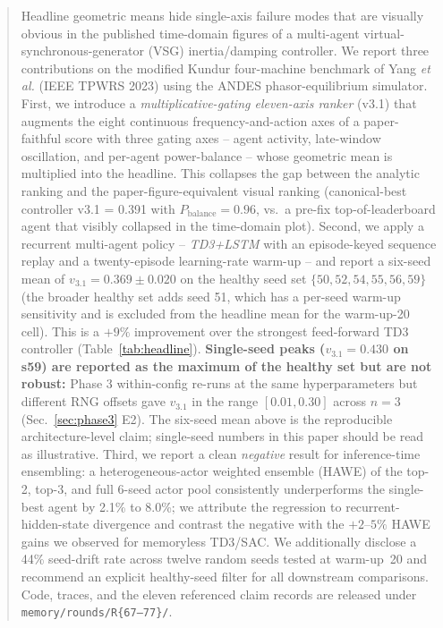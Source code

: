 \documentclass[journal,onecolumn,11pt]{IEEEtran}
\begin{document}
\begin{abstract}
Headline geometric means hide single-axis failure modes that are
visually obvious in the published time-domain figures of a
multi-agent virtual-synchronous-generator (VSG) inertia/damping
controller. We report three contributions on the modified Kundur
four-machine benchmark of Yang \emph{et al.} (IEEE TPWRS 2023) using
the ANDES phasor-equilibrium simulator. First, we introduce a
\emph{multiplicative-gating eleven-axis ranker} (v3.1) that augments
the eight continuous frequency-and-action axes of a paper-faithful
score with three gating axes -- agent activity, late-window
oscillation, and per-agent power-balance -- whose geometric mean is
multiplied into the headline. This collapses the gap between the
analytic ranking and the paper-figure-equivalent visual ranking
(canonical-best controller v3.1 = 0.391 with $P_{\text{balance}} =
0.96$, vs.\ a pre-fix top-of-leaderboard agent that visibly collapsed
in the time-domain plot). Second, we apply a recurrent multi-agent
policy -- \emph{TD3+LSTM} with an episode-keyed sequence replay
and a twenty-episode learning-rate warm-up -- and report a
six-seed mean of $v_{3.1} = 0.369 \pm 0.020$ on the healthy seed
set $\{50, 52, 54, 55, 56, 59\}$ (the broader healthy set adds
seed 51, which has a per-seed warm-up sensitivity and is excluded
from the headline mean for the warm-up-20 cell). This is a $+9\%$
improvement over the strongest feed-forward TD3 controller
(Table~\ref{tab:headline}). \textbf{Single-seed peaks
($v_{3.1} = 0.430$ on s59) are reported as the maximum of the
healthy set but are not robust:} Phase 3 within-config re-runs at
the same hyperparameters but different RNG offsets gave
$v_{3.1}$ in the range $[0.01, 0.30]$ across $n=3$
(Sec.~\ref{sec:phase3} E2). The six-seed mean above is the
reproducible architecture-level claim; single-seed numbers in
this paper should be read as illustrative. Third, we report a clean
\emph{negative} result for inference-time ensembling: a
heterogeneous-actor weighted ensemble (HAWE) of the top-2, top-3,
and full 6-seed actor pool consistently underperforms the single-best
agent by 2.1\% to 8.0\%; we attribute the regression to
recurrent-hidden-state divergence and contrast the negative with the
$+2$--$5\%$ HAWE gains we observed for memoryless TD3/SAC. We
additionally disclose a 44\% seed-drift rate across twelve random
seeds tested at warm-up~20 and recommend an explicit healthy-seed
filter for all downstream comparisons. Code, traces, and the eleven
referenced claim records are released under
\texttt{memory/rounds/R\{67--77\}/}.
\end{abstract}
\end{document}
